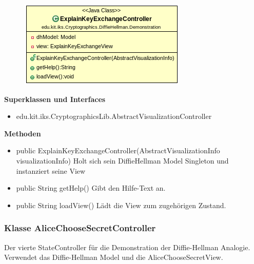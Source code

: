 \documentclass{article}
\begin{document}
      \begin{figure}[H]
        \centering
        \includegraphics[width=\textwidth]{resources/edu-kit-iks-Cryptographics-DiffieHellman-Demonstration-ExplainKeyExchangeController}
      \end{figure}

      \textbf{Superklassen und Interfaces}
      \begin{itemize}
        \item edu.kit.iks.CryptographicsLib.AbstractVisualizationController
      \end{itemize}

      \textbf{Methoden}
      \begin{itemize}
          \item public ExplainKeyExchangeController(AbstractVisualizationInfo visualizationInfo) \newline
              Holt sich sein DiffieHellman Model Singleton und instanziert seine View
        \item public String getHelp() \newline
        Gibt den Hilfe-Text an.
        \item public String loadView() \newline
        Lädt die View zum zugehörigen Zustand.
      \end{itemize}

\subsubsection{Klasse AliceChooseSecretController}
      Der vierte StateController für die Demonstration der Diffie-Hellman Analogie.
      Verwendet das Diffie-Hellman Model und die AliceChooseSecretView.
\end{document}
